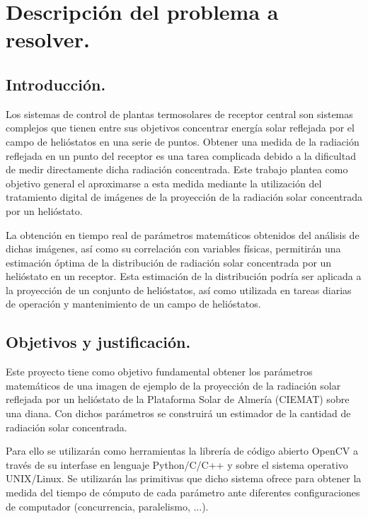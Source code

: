 \chapter{Descripci\'on del problema a resolver.}

\section{Introducción.}

Los sistemas de control de plantas termosolares de receptor central son sistemas complejos que tienen entre sus objetivos concentrar energía solar reflejada por el campo de helióstatos en una serie de puntos. Obtener una medida de la radiación reflejada en un punto del receptor es una tarea complicada debido a la dificultad de medir directamente dicha radiación concentrada. Este trabajo plantea como objetivo general el aproximarse a esta medida mediante la utilización del tratamiento digital de imágenes de la proyección de la radiación solar concentrada por un helióstato.

La obtención en tiempo real de parámetros matemáticos obtenidos del análisis de dichas imágenes, así como su correlación con variables físicas, permitirán una estimación óptima de la distribución de radiación solar concentrada por un helióstato en un receptor. Esta estimación de la distribución podría ser aplicada a la proyección de un conjunto de helióstatos, así como utilizada en tareas diarias de operación y mantenimiento de un campo de helióstatos.

\section{Objetivos y justificación.}

Este proyecto tiene como objetivo fundamental obtener los parámetros matemáticos de una imagen de ejemplo de la proyección de la radiación solar reflejada por un helióstato de la Plataforma Solar de Almería (CIEMAT) sobre una diana. Con dichos parámetros se construirá un estimador de la cantidad de radiación solar concentrada.

Para ello se utilizarán como herramientas la librería de código abierto OpenCV a través de su interfase en lenguaje Python/C/C++ y sobre el sistema operativo UNIX/Linux. Se utilizarán las primitivas que dicho sistema ofrece para obtener la medida del tiempo de cómputo de cada parámetro ante diferentes configuraciones de computador (concurrencia, paralelismo, ...). \cite{OpenCVWebSite} \cite{SALWebSite} \cite{IEEEXploreWebSite}

